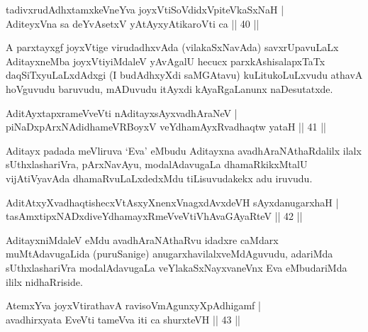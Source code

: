 
\begin{shl}
tadivxrudAdhxtamxkeVneYva joyxVtiSoVdidxVpiteVkaSxNaH |\\
AditeyxVna sa deYvA\s setxV yAtAyxyAtikaroVti ca \hfill||  40 ||  
\end{shl}

\begin{artha}
A parxtayxgf joyxVtige virudadhxvAda (vilakaSxNavAda) savxrUpavuLaLx AditayxneMba joyxVtiyiMdaleV yAvAgalU hecucx parxkAshisalapxTaTx daqSiTxyuLaLxdAdxgi (I budAdhxyXdi saMGAtavu) kuLitukoLuLxvudu athavA hoVguvudu baruvudu, mADuvudu itAyxdi kAyaRgaLanunx naDesutatxde.
\end{artha}


\begin{shl}
AditAyxtapxrameVveVti nA\s \s ditayxsAyxvadhAraNeV | \\
piNaDxpArxNAdidhameVRBoyxV veYdhamAyxRvadhaqtw yataH \hfill||  41 ||  
\end{shl}

\begin{artha}
Aditayx padada meVliruva `Eva' eMbudu Aditayxna avadhAraNAthaRdalilx ilalx sUthxlashariVra, pArxNavAyu, modalAdavugaLa dhamaRkikxMtalU vijAtiVyavAda dhamaRvuLaLxdedxMdu tiLisuvudakekx adu iruvudu.
\end{artha}

\begin{shl}
AditAtxyXvadhaqtishecxVtAsxyXnenxVnagxdAvxdeVH sAyxdanugarxhaH | \\
tasAmxtipxNADxdiveYdhamayxRmeVveVtiVhAvaGAyaRteV \hfill||  42 ||  
\end{shl}

\begin{artha}
AditayxniMdaleV eMdu avadhAraNAthaRvu idadxre caMdarx muMtAdavugaLida (puruSanige) anugarxhavilalxveMdAguvudu, adariMda sUthxlashariVra modalAdavugaLa veYlakaSxNayxvaneVnx Eva eMbudariMda ililx nidhaRriside.
\end{artha}


\begin{shl}
AtemxYva joyxVtirathavA ravisoVmAgunxyXpAdhigamf | \\
avadhirxyata EveVti tameVva iti ca shurxteVH \hfill||  43 ||  
\end{shl}

